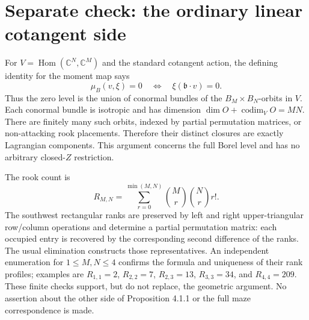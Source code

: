 \documentclass[10pt]{article}
\begin{document}
\section*{Separate check: the ordinary linear cotangent side}
For \(V=\operatorname{Hom}(\mathbb C^N,\mathbb C^M)\) and the standard cotangent action, the defining identity for the moment map says \[\mu_B(v,\xi)=0
 \quad\Longleftrightarrow\quad
 \xi(\mathfrak b\cdot v)=0.\] Thus the zero level is the union of conormal bundles of the \(B_M\times B_N\)-orbits in \(V\). Each conormal bundle is isotropic and has dimension \(\dim O+\operatorname{codim}_V O=MN\). There are finitely many such orbits, indexed by partial permutation matrices, or non-attacking rook placements. Therefore their distinct closures are exactly Lagrangian components. This argument concerns the full Borel level and has no arbitrary closed-\(Z\) restriction.\par
The rook count is \[R_{M,N}=\sum_{r=0}^{\min(M,N)}
 \binom Mr\binom Nr r!.\] The southwest rectangular ranks are preserved by left and right upper-triangular row/column operations and determine a partial permutation matrix: each occupied entry is recovered by the corresponding second difference of the ranks. The usual elimination constructs those representatives. An independent enumeration for \(1\leq M,N\leq4\) confirms the formula and uniqueness of their rank profiles; examples are \(R_{1,1}=2\), \(R_{2,2}=7\), \(R_{2,3}=13\), \(R_{3,3}=34\), and \(R_{4,4}=209\). These finite checks support, but do not replace, the geometric argument. No assertion about the other side of Proposition 4.1.1 or the full maze correspondence is made.\par
\end{document}
